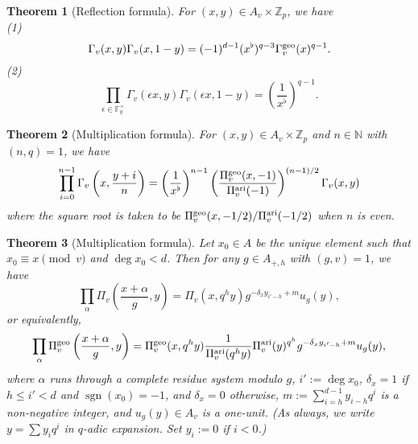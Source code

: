 \documentclass[11pt]{amsart}
\theoremstyle{plain}
\newtheorem{thm}{Theorem}[subsection]
\theoremstyle{definition}
\theoremstyle{remark}
\numberwithin{equation}{section}
\newcommand{\ZZ}{\mathbb{Z}}
\newcommand{\NN}{\mathbb{N}}
\newcommand{\FF}{\mathbb{F}}
\newcommand{\sgn}{\operatorname{sgn}}
\newcommand{\Fqst}{\FF_q^\times}
\newcommand{\vaf}{\Pi_v^{\textnormal{ari}}}
\newcommand{\vgf}{\Pi_v^{\textnormal{geo}}}
\newcommand{\vgg}{\Gamma_v^{\textnormal{geo}}}
\newcommand{\vtf}{\Pi_v}
\newcommand{\vtg}{\Gamma_v}
\begin{document}
	\begin{thm}[Reflection formula]
		For $(x,y) \in A_v \times \ZZ_p$, we have  \\
		(1)
		$$
		\vtg(x,y) \vtg(x,1-y)
		= (-1)^{d-1} (x^{\flat})^{q-3} \vgg(x)^{q-1}.
		$$
		(2)
		$$
		\prod_{\epsilon\in \Fqst}
		\vtg(\epsilon x,y) \vtg(\epsilon x,1-y)
		= \left( \frac{1}{x^{\flat}} \right)^{q-1}.
		$$
	\end{thm}
	
	\begin{thm}[Multiplication formula]
		For $(x,y) \in A_v \times \ZZ_p$ and $n\in\NN$ with $(n,q)=1$, we have
		$$
		\prod_{i=0}^{n-1} \vtg\left(x,\frac{y+i}{n}\right)
		= \left(\frac{1}{x^\flat}\right)^{n-1}
		\left( \frac{\vgf(x,-1)}{\vaf(-1)} \right)^{(n-1)/2}
		\vtg(x,y)
		$$
		where the square root is taken to be $\vgf(x,-1/2)/\vaf(-1/2)$ when $n$ is even.
	\end{thm}
	
	\begin{thm}[Multiplication formula]   \label{multiplication-formula}
		Let $x_0 \in A$ be the unique element such that $x_0 \equiv x \pmod{v}$ and $\deg x_0 < d$.
		Then for any $g\in A_{+,h}$ with $(g,v) = 1$, we have
		$$
		\prod_{\alpha} \vtf\left(\frac{x+\alpha}{g},y\right) = \vtf(x,q^h y) g^{-\delta_x y_{i'-h} + m} u_g(y),
		$$
		or equivalently,
		$$
		\prod_{\alpha} \vgf\left(\frac{x+\alpha}{g},y\right)
		= \vgf(x,q^h y) \frac{1}{\vaf(q^hy)} \vaf(y)^{q^h}
		g^{-\delta_x y_{i'-h} + m} u_g(y),
		$$
		where $\alpha$ runs through a complete residue system modulo $g$, $i':=\deg x_0$, $\delta_x = 1$ if $h \leq i' <d$ and $\sgn(x_0) = -1$, and $\delta_x = 0$ otherwise, $m:=\sum_{i=h}^{d-1} y_{i-h}q^i$ is a non-negative integer, and $u_g(y)\in A_v$ is a one-unit.
		(As always, we write $y = \sum y_i q^i$ in $q$-adic expansion.
		Set $y_i := 0$ if $i<0$.)
	\end{thm}
	
\end{document}
